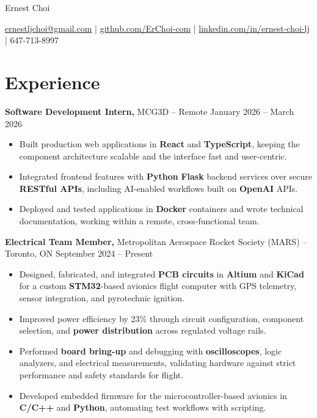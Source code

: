 \documentclass[11pt]{article}
\begin{document}
\centerline{\Huge Ernest Choi}
\vspace{3pt}

\centerline{%
  \href{mailto:ernestljchoi@gmail.com}{ernestljchoi@gmail.com} |
  \href{https://www.github.com/ErChoi-com}{github.com/ErChoi-com} |
  \href{https://www.linkedin.com/in/ernest-choi-lj}{linkedin.com/in/ernest-choi-lj} |
  647-713-8997
}

\section*{Experience}

\smallskip
\textbf{Software Development Intern,} {MCG3D} -- Remote \hfill January 2026 -- March 2026 \\
\begin{itemize}
  \item Built production web applications in \textbf{React} and \textbf{TypeScript}, keeping the component architecture scalable and the interface fast and user-centric.
  \item Integrated frontend features with \textbf{Python} \textbf{Flask} backend services over secure \textbf{RESTful APIs}, including AI-enabled workflows built on \textbf{OpenAI} APIs.
  \item Deployed and tested applications in \textbf{Docker} containers and wrote technical documentation, working within a remote, cross-functional team.
\end{itemize}

\smallskip
\textbf{Electrical Team Member,} {Metropolitan Aerospace Rocket Society (MARS)} -- Toronto, ON \hfill September 2024 -- Present \\
\begin{itemize}
  \item Designed, fabricated, and integrated \textbf{PCB circuits} in \textbf{Altium} and \textbf{KiCad} for a custom \textbf{STM32}-based avionics flight computer with GPS telemetry, sensor integration, and pyrotechnic ignition.
  \item Improved power efficiency by 23\% through circuit configuration, component selection, and \textbf{power distribution} across regulated voltage rails.
  \item Performed \textbf{board bring-up} and debugging with \textbf{oscilloscopes}, logic analyzers, and electrical measurements, validating hardware against strict performance and safety standards for flight.
  \item Developed embedded firmware for the microcontroller-based avionics in \textbf{C/C++} and \textbf{Python}, automating test workflows with scripting.
\end{itemize}
\end{document}

